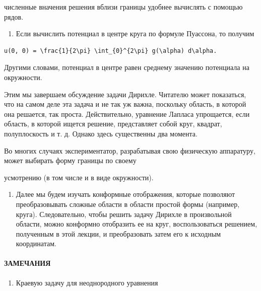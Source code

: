 \documentclass[
  ukrainian,
]{article}
\providecommand{\tightlist}{%
  \setlength{\itemsep}{0pt}\setlength{\parskip}{0pt}}
\begin{document}
численные вначения решения вблизи границы удобнее вычислять с помощью
рядов.

\begin{enumerate}
\def\labelenumi{\arabic{enumi}.}
\setcounter{enumi}{1}
\tightlist
\item
  Если вычислить потенциал в центре круга по формуле Пуассона, то
  получим
\end{enumerate}

\begin{verbatim}
u(0, 0) = \frac{1}{2\pi} \int_{0}^{2\pi} g(\alpha) d\alpha.
\end{verbatim}

Другими словами, потенциал в центре равен среднему значению потенциала
на окружности.

Этим мы завершаем обсуждение задачи Дирихле. Читателю может показаться,
что на самом деле эта задача и не так уж важна, поскольку область, в
которой она решается, так проста. Действительно, уравнение Лапласа
упрощается, если область, в которой ищется решение, представляет собой
круг, квадрат, полуплоскость и т. д. Однако здесь существенны два
момента.

Во многих случаях экспериментатор, разрабатывая свою физическую
аппаратуру, может выбирать форму границы по своему

усмотрению (в том числе и в виде окружности).

\begin{enumerate}
\def\labelenumi{\arabic{enumi}.}
\setcounter{enumi}{1}
\tightlist
\item
  Далее мы будем изучать конформные отображения, которые позволяют
  преобразовывать сложные области в области простой формы (например,
  круга). Следовательно, чтобы решить задачу Дирихле в произвольной
  области, можно конформно отобразить ее на круг, воспользоваться
  решением, полученным в этой лекции, и преобразовать затем его к
  исходным координатам.
\end{enumerate}

\paragraph{ЗАМЕЧАНИЯ}\label{ux437ux430ux43cux435ux447ux430ux43dux438ux44f-8}

\begin{enumerate}
\def\labelenumi{\arabic{enumi}.}
\tightlist
\item
  Краевую задачу для неоднородного уравнения
\end{enumerate}
\end{document}
